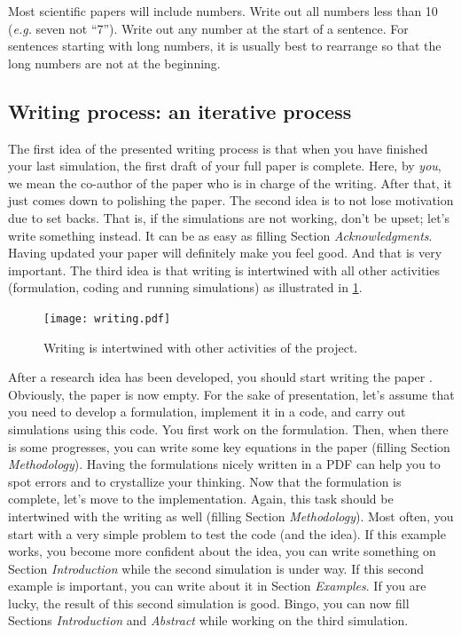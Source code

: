 \documentclass[authoryear,12pta4paper,fleqn]{article}
\newcommand{\eg}{\textit{e.g.}\xspace}
\numberwithin{equation}{section}
\theoremstyle{remark}
\begin{document}
Most scientific papers will include numbers. Write out all numbers less than 10 (\eg seven not “7”). Write out any number at the start of a sentence. For sentences starting with long numbers, it is usually best to rearrange so that the long numbers are not at the beginning.





\subsection{Writing process: an iterative process}\label{sec:writing-process}

The  first idea of the presented writing process is that when you have finished your last simulation, the first draft of your full paper is complete. Here, by \textit{you}, we mean the co-author of the paper who is in charge of the writing. After that, it just comes down to polishing the paper. The second idea is to not lose motivation due to set backs. That is, if the simulations are not working, don't be upset; let's write something instead. It can be as easy as filling Section \textit{Acknowledgments}. Having updated your paper will definitely make you feel good. And that is very important. The third idea is that writing is intertwined with all other activities (formulation, coding and running simulations) as illustrated in \cref{fig:writing}. 

 \begin{figure}[!ht]
      \centering
      \texttt{[image: writing.pdf]}
      \caption{Writing is intertwined with other activities of the project.}
      \label{fig:writing}
    \end{figure}

After a research idea has been developed, you should start writing the paper \citep{Gray:2005a}. Obviously, the paper is now empty.
For the sake of presentation, let's assume that you need to develop a formulation, implement it in a code, and carry out simulations using this code. You first work on the formulation. Then, when there is some progresses, you can write some key equations in the paper (filling Section \textit{Methodology}). Having the formulations nicely written in a PDF can help you to spot errors and to crystallize your thinking. Now that the formulation is complete, let's move to the implementation. Again, this task should be intertwined  with the writing as well (filling Section \textit{Methodology}). Most often, you start with a very simple problem to test the code (and the idea). If this example works, you become more confident about the idea, you can write something on Section \textit{Introduction} while the second simulation is under way. If this second example is important, you can write about it in Section \textit{Examples}. If you are lucky, the result of this second simulation is  good. Bingo, you can now fill  Sections \textit{Introduction} and  \textit{Abstract} while working on the third simulation.
\end{document}
